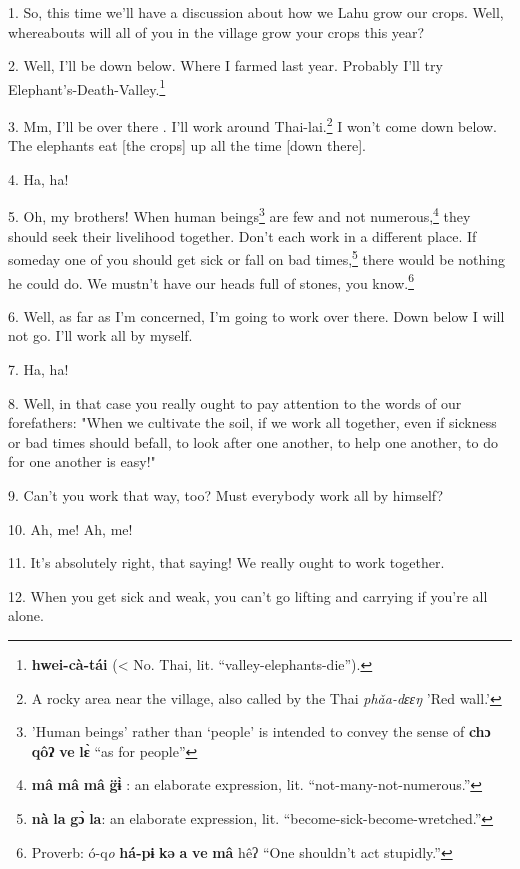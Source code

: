 \setcounter{footnote}{0}


1. So, this time we'll have a discussion about how we Lahu grow our crops. Well,
whereabouts will all of you in the village grow your crops this year?

2. Well, I'll be down below. Where I farmed last year. Probably I'll try Elephant's-Death-Valley.\footnote{\textbf{hwei-cà-tái} (< No. Thai, lit. ``valley-elephants-die'').}

3. Mm, I'll be over there . I'll work around Thai-lai.\footnote{A rocky area near the village, also called by the Thai \textit{phǎa-dɛɛŋ }'Red wall.'}
I won't come down below. The elephants eat [the crops] up all the time [down there].

4. Ha, ha!

5. Oh, my brothers! When human beings\footnote{'Human beings' rather than `people' is intended to convey the sense of \textbf{chɔ} \textbf{qôʔ} \textbf{ve} \textbf{lɛ̀} ``as for people''} are few and not numerous,\footnote{\textbf{mâ} \textbf{mâ} \textbf{mâ} \textbf{g̈ɨ̀} : an elaborate expression, lit. ``not-many-not-numerous.''} they should
seek their livelihood together. Don't each work in a different place. If someday
one of you should get sick or fall on bad times,\footnote{\textbf{nà} \textbf{la} \textbf{gɔ̀} \textbf{la}: an elaborate expression, lit. ``become-sick-become-wretched.''} there would be nothing he could
do. We mustn't have our heads full of stones, you know.\footnote{Proverb: ó-q\textit{\emph{o}} \textbf{há-pɨ} \textbf{kə} \textbf{a} \textbf{ve} \textbf{mâ} hêʔ ``One shouldn't act stupidly.''}

6. Well, as far as I'm concerned, I'm going to work over there. Down below I will
not go. I'll work all by myself.

7. Ha, ha!

8. Well, in that case you really ought to pay attention to the words of our forefathers:
"When we cultivate the soil, if we work all together, even if sickness
or bad times should befall, to look after one another, to help one another, to
do for one another is easy!"

9. Can't you work that way, too? Must everybody work all by himself?

10. Ah, me! Ah, me!

11. It's absolutely right, that saying! We really ought to work together.

12. When you get sick and weak, you can't go lifting and carrying if you're all
alone.

